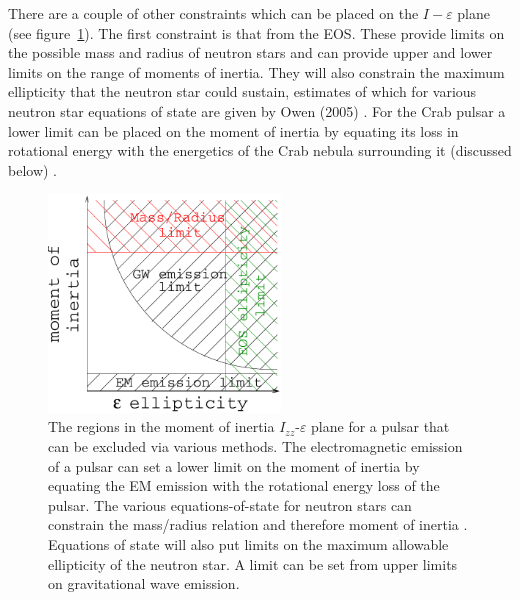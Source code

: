 There are a couple of other constraints which can be placed on the $I-\varepsilon$ plane (see
figure~\ref{Ieplane}). The first constraint is that from the EOS. These provide limits on the
possible mass and radius of neutron stars and can provide upper and lower limits on the range of
moments of inertia. They will also constrain the maximum ellipticity that the neutron star could
sustain, estimates of which for various neutron star equations of state are given by Owen (2005)
\cite{Owen:2005}. For the Crab pulsar a lower limit can be placed on the moment of inertia by
equating its loss in rotational energy with the energetics of the Crab nebula surrounding it
(discussed below) \cite{Bejger:2003}.
\begin{figure}[!htbp]
\begin{center}
\includegraphics[width=0.55\textwidth]{figs/Ieplane}\caption[The regions in the moment of inertia
$I_{zz}$-$\varepsilon$ plane for a pulsar that can be excluded via various methods.]{The regions in
the moment of inertia $I_{zz}$-$\varepsilon$ plane for a pulsar that can be excluded via various
methods. The electromagnetic emission of a pulsar can set a lower limit on the moment of inertia by
equating the EM emission with the rotational energy loss of the pulsar. The various
equations-of-state for neutron stars can constrain the mass/radius relation and therefore moment of
inertia \cite{Lattimer:2001}. Equations of state will also put limits on the maximum allowable
ellipticity of the neutron star. A limit can be set from upper limits on gravitational wave
emission.}\label{Ieplane}
\end{center}
\end{figure}


